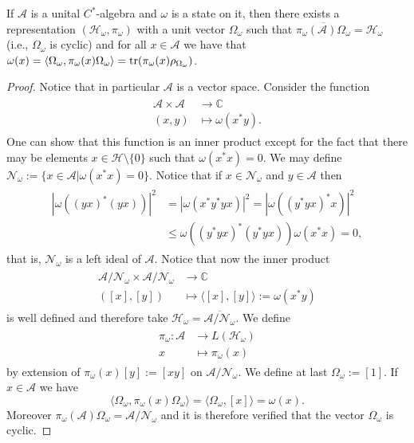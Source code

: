 \begin{theorem}
If $\mathcal{A}$ is a unital $C^*$-algebra and $\omega$ is a state on it, then there exists a representation $(\mathcal{H}_\omega,\pi_\omega)$ with a unit vector $\Omega_\omega$ such that $\overline{\pi_\omega(\mathcal{A})\Omega_\omega}=\mathcal{H}_\omega$ (i.e., $\Omega_\omega$ is cyclic) and for all $x\in\mathcal{A}$ we have that $\omega(x)=\langle\Omega_\omega,\pi_\omega(x)\Omega_\omega\rangle=\operatorname{tr}(\pi_\omega(x)\rho_{\Omega_\omega})$.  
\end{theorem}

\begin{proof}
Notice that in particular $\mathcal{A}$ is a vector space. Consider the function
\begin{align}
\begin{split}
\mathcal{A}\times\mathcal{A}&\rightarrow\mathbb{C} \\
(x,y)&\mapsto\omega(x^*y).
\end{split}
\end{align}
One can show that this function is an inner product except for the fact that there may be elements $x\in\mathcal{H}\setminus\{0\}$ such that $\omega(x^*x)=0$. We may define $\mathcal{N}_\omega := \{x\in\mathcal{A}|\omega(x^*x)=0\}$. Notice that if $x\in\mathcal{N}_\omega$ and $y\in\mathcal{A}$ then 
\begin{align}
\begin{split}
|\omega((yx)^*(yx))|^2&=|\omega(x^*y^*yx)|^2=|\omega((y^*yx)^*x)|^2 \\
&\leq\omega((y^*yx)^*(y^*yx))\omega(x^*x)=0,
\end{split}
\end{align}
that is, $\mathcal{N}_\omega$ is a left ideal of $\mathcal{A}$. Notice that now the inner product
\begin{align}
\begin{split}
\mathcal{A}/\mathcal{N}_\omega\times\mathcal{A}/\mathcal{N}_\omega&\rightarrow\mathbb{C} \\
([x],[y])&\mapsto\langle[x],[y]\rangle:=\omega(x^*y)
\end{split}
\end{align}
is well defined and therefore take $\mathcal{H}_\omega=\overline{\mathcal{A}/\mathcal{N}_\omega}$. We define 
\begin{align}
\begin{split}
\pi_\omega:\mathcal{A}&\rightarrow L(\mathcal{H}_\omega) \\
x&\mapsto \pi_\omega(x)
\end{split}
\end{align}
by extension of $\pi_\omega(x)[y]:=[xy]$ on $\mathcal{A}/\mathcal{N}_\omega$. We define at last $\Omega_\omega:=[1]$. If $x\in\mathcal{A}$ we have
\begin{equation}\label{eqn:state_representation}
\langle \Omega_\omega, \pi_\omega(x)\Omega_\omega\rangle = \langle \Omega_\omega, [x]\rangle = \omega(x). 
\end{equation}
Moreover $\pi_\omega(\mathcal{A})\Omega_\omega = \mathcal{A}/\mathcal{N}_\omega$ and it is therefore verified that the vector $\Omega_\omega$ is cyclic.  
\end{proof}

